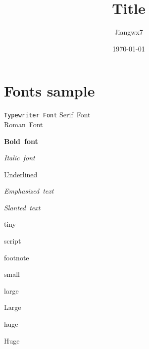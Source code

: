 \documentclass[11pt]{article}
\title{Title}
\author{Jiangwx7}
\date{\today}
\begin{document}
\maketitle
\tableofcontents
\thispagestyle{empty}

\section{Fonts sample}
\texttt{Typewriter Font}
\newline
\textsf{Serif Font}\\\textrm{Roman Font}

\textbf{Bold font}

\textit{Italic font}

\underline{Underlined}

\emph{Emphasized text}

\textsl{Slanted text}

\newpage

{\tiny tiny}

{\scriptsize script}

{\footnotesize footnote}

{\small small}

\thispagestyle{fancy}

{\large large}

{\Large Large}

{\huge huge}

{\Huge Huge}
\end{document}

